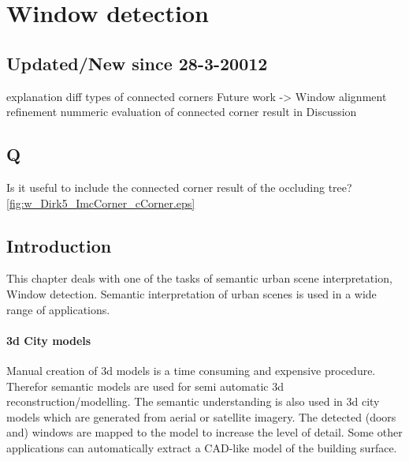 





%
%




\section{Window detection}
\subsection{Updated/New since 28-3-20012}
explanation diff types of connected corners
Future work -> Window alignment refinement
nummeric evaluation of connected corner result in Discussion 

\subsection{Q}
Is it useful to include the connected corner result of the occluding tree?
\ref{fig:w_Dirk5_ImcCorner_cCorner.eps}

\label{chap:windowDetection}
\subsection{Introduction}
This chapter deals with one of the tasks of semantic urban scene interpretation, Window detection. 
Semantic interpretation of urban scenes is used in a wide range of applications.

\paragraph{3d City models} 
	Manual creation of 3d models is a time consuming and expensive procedure.
	Therefor semantic models are used for semi automatic 3d
	reconstruction/modelling.
	The semantic understanding is also used in 3d city models which are
	generated from aerial or satellite imagery.  The detected (doors and)
	windows are mapped to the model to increase the level of detail. 
	Some other applications can automatically extract a CAD-like model of
	the building surface.

